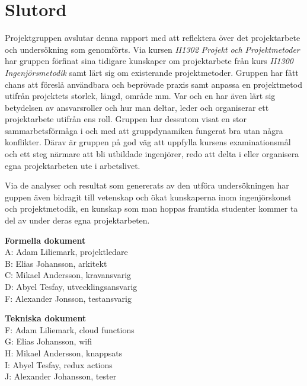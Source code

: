 \documentclass[conference]{IEEEtran}
\begin{document}
\section*{Slutord}
Projektgruppen avslutar denna rapport med att reflektera över det projektarbete och undersökning som genomförts. Via kursen \textit{II1302 Projekt och Projektmetoder} har gruppen förfinat sina tidigare kunskaper om projektarbete från kurs \textit{II1300 Ingenjörsmetodik} samt lärt sig om existerande projektmetoder. Gruppen har fått chans att föreslå användbara och beprövade praxis samt anpassa en projektmetod utifrån projektets storlek, längd, område mm. Var och en har även lärt sig betydelsen av ansvarsroller och hur man deltar, leder och organiserar ett projektarbete utifrån ens roll. Gruppen har dessutom visat en stor sammarbetsförmåga i och med att gruppdynamiken
fungerat bra utan några konflikter. Därav är gruppen på god väg att uppfylla kursens examinationsmål och ett steg närmare att bli utbildade ingenjörer, redo att delta i eller organisera egna projektarbeten ute i arbetslivet.

Via de analyser och resultat som genererats av den utföra undersökningen har guppen även bidragit till vetenskap och ökat kunskaperna inom ingenjörskonst och projektmetodik, en kunskap som man hoppas framtida studenter kommer ta del av under deras egna projektarbeten.\\

\vspace{12pt}




\newpage

\appendix
\textbf{Formella dokument}\\
A: Adam Liliemark, projektledare\\
B: Elias Johansson, arkitekt\\
C: Mikael Andersson, kravansvarig\\
D: Abyel Tesfay, utvecklingsansvarig\\
F: Alexander Jonsson, testansvarig

\textbf{Tekniska dokument}\\
F: Adam Liliemark, cloud functions\\
G: Elias Johansson, wifi\\
H: Mikael Andersson, knappsats\\
I: Abyel Tesfay, redux actions\\
J: Alexander Johansson, tester
\end{document}
